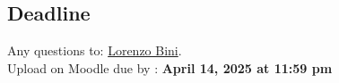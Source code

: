 \subsection*{Deadline}
Any questions to: \href{mailto:Lorenzo.Bini@unige.ch}{Lorenzo Bini}.\\
Upload on Moodle due by : \textbf{April 14, 2025 at 11:59 pm}